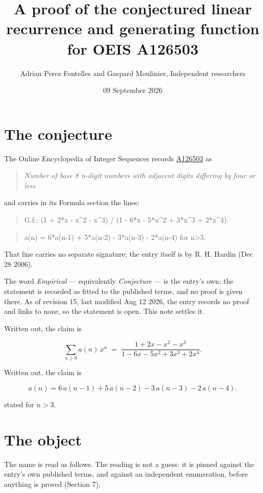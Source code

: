 \documentclass[11pt]{article}
\title{A proof of the conjectured linear recurrence and generating function for OEIS A126503}
\author{Adrian Perez Fontelles and Gaspard Moulinier, Independent researchers}
\date{09 September 2026}
\theoremstyle{definition}
\begin{document}
\maketitle
\section{The conjecture}

The Online Encyclopedia of Integer Sequences records \href{https://oeis.org/A126503}{A126503} as

\begin{quote}\itshape Number of base 8 n-digit numbers with adjacent digits differing by four or less\end{quote}

and carries in its Formula section the lines:

\begin{quote}\ttfamily G.f.: (1 + 2*x - x\textasciicircum{}2 - x\textasciicircum{}3) / (1 - 6*x - 5*x\textasciicircum{}2 + 3*x\textasciicircum{}3 + 2*x\textasciicircum{}4).\end{quote}

\begin{quote}\ttfamily a(n) = 6*a(n-1) + 5*a(n-2) - 3*a(n-3) - 2*a(n-4) for n>3.\end{quote}

That line carries no separate signature; the entry itself is by R. H. Hardin (Dec 28 2006).

The word {\itshape Empirical} --- equivalently {\itshape Conjecture} --- is the entry's own: the statement is recorded as fitted to the published terms, and no proof is given there. As of revision 15, last modified Aug 12 2026, the entry records no proof and links to none, so the statement is open. This note settles it.

Written out, the claim is

\[\sum_{n \ge 0} a(n)\,x^n \;=\; \frac{1 + 2x - x^{2} - x^{3}}{1 - 6x - 5x^{2} + 3x^{3} + 2x^{4}}.\]

Written out, the claim is

\[a(n) = 6\,a(n-1) + 5\,a(n-2) - 3\,a(n-3) - 2\,a(n-4).\]

stated for $n > 3$.

\section{The object}

The name is read as follows. The reading is not a guess: it is pinned against the entry's own published terms, and against an independent enumeration, before anything is proved (Section 7).
\end{document}
